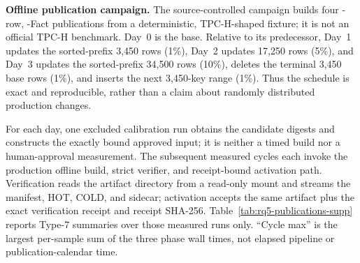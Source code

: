 \documentclass[journal,onecolumn]{IEEEtran}
\begin{document}
\textbf{Offline publication campaign.}
The source-controlled campaign builds four \RQFiveRows-row,
\RQFiveFacts-Fact publications from a deterministic, TPC-H-shaped fixture; it
is not an official TPC-H benchmark. Day~0 is the base. Relative to its
predecessor, Day~1 updates the sorted-prefix 3,450 rows (1\%), Day~2 updates
17,250 rows (5\%), and Day~3 updates the sorted-prefix 34,500 rows (10\%),
deletes the terminal 3,450 base rows (1\%), and inserts the next 3,450-key range
(1\%). Thus the schedule is exact and reproducible, rather than a claim about
randomly distributed production changes.

For each day, one excluded calibration run obtains the candidate digests and
constructs the exactly bound approved input; it is neither a timed build nor a
human-approval measurement. The subsequent \RQFiveBuildRunsPerDay{} measured
cycles each invoke the production offline build, strict verifier, and
receipt-bound activation path. Verification reads the artifact directory from
a read-only mount and streams the manifest, HOT, COLD, and sidecar; activation
accepts the same artifact plus the exact verification receipt and receipt
SHA-256. Table~\ref{tab:rq5-publications-supp} reports Type-7 summaries over
those measured runs only. ``Cycle max'' is the largest per-sample sum of the
three phase wall times, not elapsed pipeline or publication-calendar time.

\begin{table}[t]
\centering
\caption{RQ5 offline publication results. Build columns are p50/p95; verify and
activate are p50. All times are seconds and artifact size is GiB.}
\label{tab:rq5-publications-supp}
\small
{}
\end{table}
\end{document}
